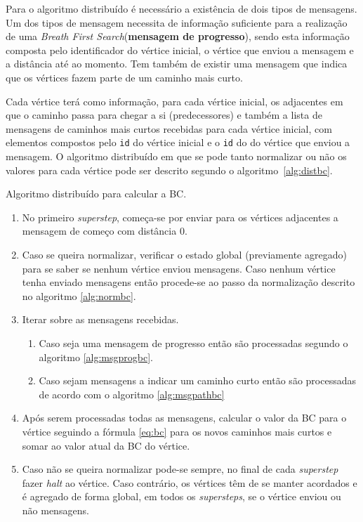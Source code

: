 Para o algoritmo distribuído é necessário a existência de dois tipos de 
mensagens. Um dos tipos de mensagem necessita de informação suficiente para a realização de uma \textit{Breath First Search}(\textbf{mensagem de progresso}), sendo esta 
informação composta pelo identificador do vértice inicial, o vértice que enviou a mensagem e a distância 
até ao momento. Tem também de existir 
uma mensagem que indica que os vértices fazem parte de um caminho mais curto. 

Cada vértice terá como informação, para cada vértice inicial, os adjacentes em que o caminho passa para chegar a si (predecessores) e também a 
lista de mensagens de caminhos mais curtos recebidas para cada vértice inicial, com elementos compostos pelo \verb|id| do vértice inicial e o \verb|id| do do vértice que enviou a mensagem. O algoritmo distribuído em que se pode tanto normalizar ou não os 
valores para cada vértice pode ser descrito segundo o algoritmo~\ref{alg:distbc}.

\begin{algorithm}
  \caption{Algoritmo distribuído para calcular a BC.}
  \label{alg:distbc}
  \begin{enumerate}  
    \item No primeiro \textit{superstep}, começa-se por enviar 
  para os vértices adjacentes a mensagem de começo com distância 0.
    \item Caso se queira normalizar, verificar o estado global (previamente 
agregado) para se saber se nenhum vértice enviou mensagens. Caso nenhum vértice 
tenha enviado mensagens então procede-se ao passo da normalização descrito no 
algoritmo \ref{alg:normbc}.
    \item Iterar sobre as mensagens recebidas.
    \begin{enumerate}
      \item Caso seja uma mensagem de progresso então são processadas segundo o 
algoritmo \ref{alg:msgprogbc}.
      \item Caso sejam mensagens a indicar um caminho curto então são 
processadas de acordo com o algoritmo \ref{alg:msgpathbc}
    \end{enumerate}
      \item Após serem processadas todas as mensagens, calcular o valor da 
BC para o vértice seguindo a fórmula \ref{eq:bc} para os novos caminhos mais 
curtos e somar ao valor atual da BC do vértice.
      \item Caso não se queira normalizar pode-se sempre, no final de cada 
\textit{superstep} fazer \textit{halt} ao vértice. Caso contrário, os vértices 
têm de se manter acordados e é agregado de forma global, em todos os 
\textit{supersteps}, se o vértice enviou ou não mensagens.
  \end{enumerate}
\end{algorithm}

